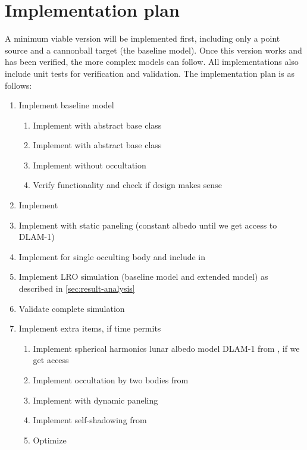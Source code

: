 \documentclass[parskip=full,DIV=15]{scrartcl}
\begin{document}
\section{Implementation plan}
A minimum viable version will be implemented first, including only a point source and a cannonball target (the baseline model). Once this version works and has been verified, the more complex models can follow. All implementations also include unit tests for verification and validation. The implementation plan is as follows:
\begin{enumerate}
   \item Implement baseline model
   \begin{enumerate}
      \item Implement  with abstract base class
      \item Implement  with abstract base class
      \item Implement  without occultation
      \item Verify functionality and check if design makes sense
   \end{enumerate}
   \item Implement  
   \item Implement  with static paneling (constant albedo until we get access to DLAM-1)
   \item Implement  for single occulting body and include in \\ 
   \item Implement LRO simulation (baseline model and extended model) as described in \cref{sec:result-analysis}
   \item Validate complete simulation
   \item Implement extra items, if time permits
   \begin{enumerate}
      \item Implement spherical harmonics lunar albedo model DLAM-1 from \textcite{Floberghagen1999}, if we get access
      \item Implement occultation by two bodies from \textcite{Zhang2019}
      \item Implement  with dynamic paneling
      \item Implement self-shadowing from \textcite{Mazarico2009}
      \item Optimize
   \end{enumerate}
\end{enumerate}







\printbibliography
\end{document}
